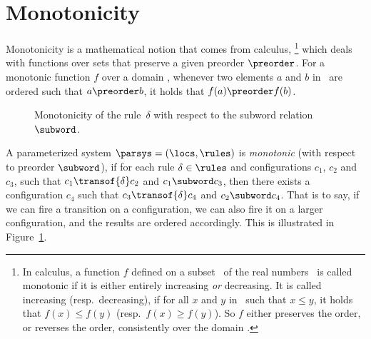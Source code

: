 \section{Monotonicity}
%
%
Monotonicity is a mathematical notion that comes from calculus,%
\footnote{In calculus, a function $f$ defined on a subset \domain\ of
  the real numbers \reals\ is called monotonic if it is either
  entirely increasing \emph{or} decreasing. It is called increasing
  (resp.\ decreasing), if for all $x$ and $y$ in \reals\ such that $x
  \leq y$, it holds that $f(x)\leq f(y)$ (resp.\ $f(x)\geq f(y)$). So
  $f$ either preserves the order, or reverses the order, consistently
  over the domain \domain .} %
which deals with functions over sets that preserve a given preorder
$\preorder$. For a monotonic function $f$ over a domain \domain ,
whenever two elements $a$ and $b$ in \domain\ are ordered such that
$a\preorder b$, it holds that $f(a) \preorder f(b)$.

%
%
\noindent%
\begin{wrapfigure}{r}[0pt]{0.45\linewidth}
  \centering
  \caption{Monotonicity of the rule~$\delta$ with respect to the
    subword relation~$\subword$.}
  \label{figure:monotonicity}
\end{wrapfigure}
%
A parameterized system \mbox{${\parsys}=(\locs,\rules)$} is
\emph{monotonic} (with respect to preorder $\subword$),
if for each rule $\delta\in\rules$ and configurations $c_1$, $c_2$ and
$c_3$, such that $c_1\transof{\delta} c_2$ and $c_1\subword c_3$, then
there exists a configuration $c_4$ such that $c_3\transof{\delta} c_4$
and $c_2\subword c_4$. That is to say, if we can fire a transition on
a configuration, we can also fire it on a larger configuration, and
the results are ordered accordingly.
%
This is illustrated in Figure~\ref{figure:monotonicity}.

